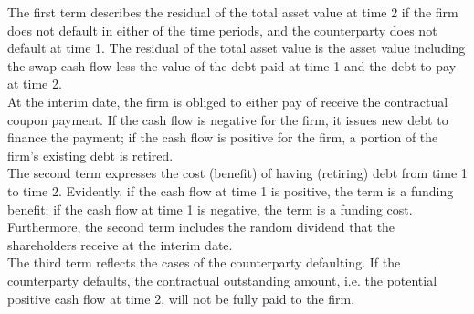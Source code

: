\documentclass[main.tex]{subfiles}
\begin{document}
        The first term describes the residual of the total asset value at time 2 if the firm does not default in either of the time periods, and the counterparty does not default at time 1.
        The residual of the total asset value is the asset value including the swap cash flow less the value of the debt paid at time 1 and the debt to pay at time 2.
        \\
        At the interim date, the firm is obliged to either pay of receive the contractual coupon payment.
        If the cash flow is negative for the firm, it issues new debt to finance the payment;
        if the cash flow is positive for the firm, a portion of the firm's existing debt is retired.
        \\
        The second term expresses the cost (benefit) of having (retiring) debt from time 1 to time 2.
        Evidently, if the cash flow at time 1 is positive, the term is a funding benefit;
        if the cash flow at time 1 is negative, the term is a funding cost.
        Furthermore, the second term includes the random dividend that the shareholders receive at the interim date.
        \\
        The third term reflects the cases of the counterparty defaulting.
        If the counterparty defaults, the contractual outstanding amount, 
        i.e. the potential positive cash flow at time 2, will not be fully paid to the firm.
        
\end{document}
